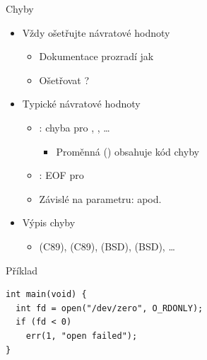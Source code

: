 \begin{frame}[fragile]{Chyby}

  \begin{itemize}
    \item Vždy ošetřujte návratové hodnoty
    \begin{itemize}
      \item Dokumentace prozradí jak

      \pause

      \item Ošetřovat ?
    \end{itemize}

    \pause

    \item Typické návratové hodnoty
    \begin{itemize}
      \item {}: chyba pro , , \dots
      \begin{itemize}
	\item Proměnná  () obsahuje kód chyby
      \end{itemize}

      \pause

      \item {}: EOF pro 

      \pause

      \item Závislé na parametru:  apod.
    \end{itemize}

    \pause

    \item Výpis chyby
    \begin{itemize}
      \item {} (C89),  (C89),  (BSD),
         (BSD), \dots
    \end{itemize}

  \end{itemize}

  \pause

  \begin{block}{Příklad}
    \begin{lstlisting}
int main(void) {
  int fd = open("/dev/zero", O_RDONLY);
  if (fd < 0)
    err(1, "open failed");
}
    \end{lstlisting}
  \end{block}

\end{frame}

